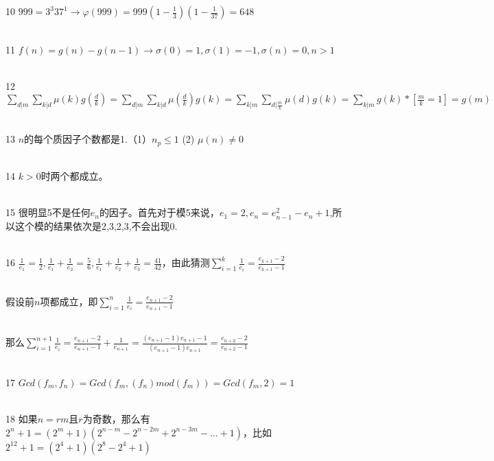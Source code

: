 \documentclass[onecolumn]{article}
\begin{document}
10 $999=3^{3}37^{1}\rightarrow \varphi (999)=999(1-\frac{1}{3})(1-\frac{1}{37})=648$\par
~\\
11 $f(n)=g(n)-g(n-1)\rightarrow \sigma (0)=1,\sigma (1)=-1,\sigma (n)=0,n>1$\par
~\\
12 $\sum_{d|m}\sum _{k|d}\mu (k)g(\frac{d}{k})=\sum_{d|m}\sum _{k|d}\mu  (\frac{d}{k})g(k)=\sum_{k|m}\sum _{d|\frac{m}{k}}\mu (d)g(k)=\sum_{k|m}g(k)*[\frac{m}{k}=1]=g(m)$\par
~\\
13 $n$的每个质因子个数都是1.（1）$n_{p}\leq 1$ (2) $\mu (n)\neq 0$ \par
~\\
14 $k>0$时两个都成立。\par
~\\
15 很明显5不是任何$e_{n}$的因子。首先对于模5来说，$e_{1}=2,e_{n}=e_{n-1}^{2}-e_{n}+1$,所以这个模的结果依次是2,3,2,3,不会出现0.\par
~\\
16 $\frac{1}{e_{1}}=\frac{1}{2},\frac{1}{e_{1}}+\frac{1}{e_{2}}=\frac{5}{6},\frac{1}{e_{1}}+\frac{1}{e_{2}}+\frac{1}{e_{3}}=\frac{41}{42}$，由此猜测$\sum_{i=1}^{k}\frac{1}{e_{i}}=\frac{e_{k+1}-2}{e_{k+1}-1}$\par
~\\
假设前$n$项都成立，即$\sum_{i=1}^{n}\frac{1}{e_{i}}=\frac{e_{n+1}-2}{e_{n+1}-1}$ \par
~\\
那么$\sum_{i=1}^{n+1}\frac{1}{e_{i}}=\frac{e_{n+1}-2}{e_{n+1}-1}+\frac{1}{e_{n+1}}=\frac{(e_{n+1}-1)e_{n+1}-1}{(e_{n+1}-1)e_{n+1}}=\frac{e_{n+2}-2}{e_{n+2}-1}$ \par
~\\
17 $Gcd(f_{m},f_{n})=Gcd(f_{m},(f_{n})mod(f_{m}))=Gcd(f_{m},2)=1$ \par
~\\
18 如果$n=rm$且$r$为奇数，那么有$2^{n}+1=(2^{m}+1)(2^{n-m}-2^{n-2m}+2^{n-3m}-...+1)$，比如$2^{12}+1=(2^{4}+1)(2^{8}-2^{4}+1)$ \par
~\\
 
\end{document}
